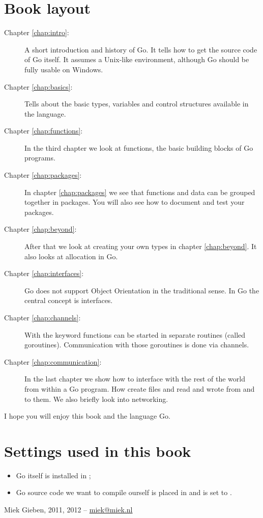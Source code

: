 \section*{Book layout}
\begin{description}
\item[Chapter \ref{chap:intro}: ]
A short introduction and history of Go. It
tells how to get the source code of Go itself. It assumes a Unix-like environment, although
Go should be fully usable on Windows.

\item[Chapter \ref{chap:basics}: ] 
Tells about the basic types, variables and control
structures available in the language.

\item[Chapter \ref{chap:functions}: ] 
In the third chapter we look at functions, the basic building blocks of Go programs.

\item[Chapter \ref{chap:packages}: ] 
In chapter \ref{chap:packages} we see that functions and data can be grouped together
in packages. You will also see how to document and test your packages.

\item[Chapter \ref{chap:beyond}: ] 
After that we look at creating your own types in chapter \ref{chap:beyond}. It also
looks at allocation in Go.

\item[Chapter \ref{chap:interfaces}: ] 
Go does not support Object Orientation in the traditional sense.
In Go the central concept is interfaces.

\item[Chapter \ref{chap:channels}: ] 
With the  keyword functions can be started in separate routines (called goroutines). 
Communication with those goroutines is done via channels. 

\item[Chapter \ref{chap:communication}: ] 
In the last chapter we show how to interface with the rest of the world from within 
a Go program. How create files and read and wrote from and to them. We also briefly
look into networking.
\end{description}

I hope you will enjoy this book and the language Go.

\section*{Settings used in this book}
\begin{itemize}
\item Go itself is installed in  ;
\item Go source code we want to compile ourself is placed in  and
 is set to  .
\end{itemize}

\begin{flushright}
Miek Gieben, 2011, 2012 -- \url{miek@miek.nl}
\end{flushright}
